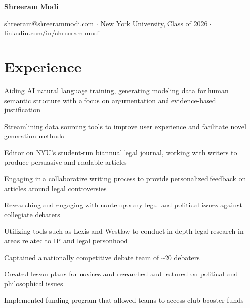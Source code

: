 \documentclass[letterpaper]{resume-shreeram}
\begin{document}
\begin{center}
  {\Huge \bfseries Shreeram Modi}

  \href{mailto:shreeram@shreerammodi.com}{shreeram@shreerammodi.com}
  $\cdot$
  New York University, Class of 2026
  $\cdot$
  \href{https://linkedin.com/in/shreeram-modi}{linkedin.com/in/shreeram-modi}
\end{center}

\section{Experience}

\begin{compactitem}
  \item Aiding AI natural language training, generating modeling data
    for human semantic structure with a focus on argumentation and
    evidence-based justification

  \item Streamlining data sourcing tools to improve user experience and
    facilitate novel generation methods
\end{compactitem}

\begin{compactitem}
  \item Editor on NYU's student-run biannual legal journal, working with
    writers to produce persuasive and readable articles

  \item Engaging in a collaborative writing process to provide
    personalized feedback on articles around legal controversies
\end{compactitem}

\begin{compactitem}
  \item Researching and engaging with contemporary legal and political
    issues against collegiate debaters

  \item Utilizing tools such as Lexis and Westlaw to conduct in depth
    legal research in areas related to IP and legal personhood
\end{compactitem}

\begin{compactitem}
    \item Captained a nationally competitive debate team of
      \textasciitilde{}20 debaters

    \item Created lesson plans for novices and researched and lectured on
      political and philosophical issues

    \item Implemented funding program that allowed teams to access club
      booster funds
\end{compactitem}
\end{document}
